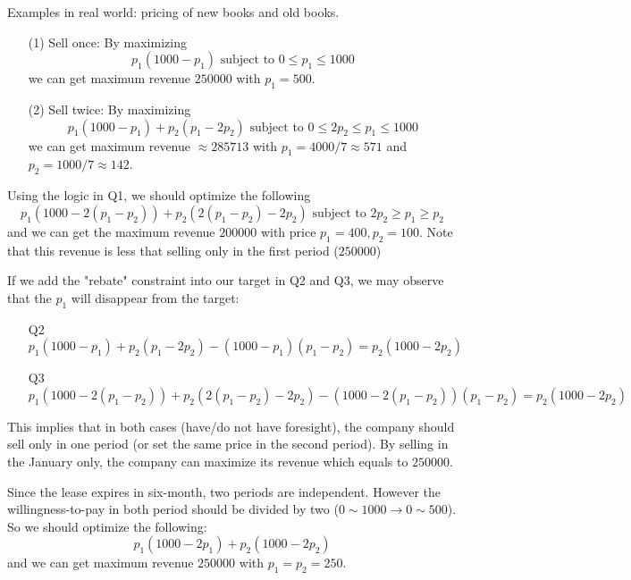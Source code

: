 \documentclass[a4paper]{article}
\begin{document}
    \begin{remarks}[Q1]
    Examples in real world: pricing of new books and old books.
    \end{remarks}
    \begin{answer}[Q2]
    \begin{itemize}
        \item[(1)] Sell once:
        By maximizing
        \[
            p_1(1000-p_1) \text{ subject to } 0 \le p_1 \le 1000
        \]
        we can get maximum revenue $250000$ with $p_1=500$.
        \item[(2)] Sell twice:
        By maximizing
        \[
            p_1(1000-p_1) + p_2(p_1-2p_2) \text{ subject to } 0 \le 2p_2\le p_1\le 1000
        \]
        we can get maximum revenue $\approx 285713$ with $p_1=4000/7\approx571$ and $p_2=1000/7\approx 142$.
    \end{itemize}
    \end{answer}
    \begin{answer}[Q3]
        Using the logic in Q1, we should optimize the following
        \[
            p_1(1000-2(p_1-p_2))+p_2(2(p_1-p_2)-2p_2) \text{ subject to } 2p_2 \ge p_1 \ge p_2
        \]
        and we can get the maximum revenue $200000$  with price $p_1=400,p_2=100$. Note that this revenue is less that selling only in the first period ($250000$)
    \end{answer}
    \begin{answer}[Q4]
    If we add the "rebate" constraint into our target in Q2 and Q3, we may observe that the $p_1$ will disappear from the target:
    \begin{itemize}
        \item[Q2]
        \[
            p_1(1000-p_1)+p_2(p_1-2p_2)-(1000-p_1)(p_1-p_2) = p_2(1000-2p_2)
        \]
        \item[Q3]
        \[
            p_1(1000-2(p_1-p_2))+p_2(2(p_1-p_2)-2p_2)-(1000-2(p_1-p_2))(p_1-p_2) = p_2(1000-2p_2)
        \]
    \end{itemize}
    This implies that in both cases (have/do not have foresight), the company should sell only in one period (or set the same price in the second period). By selling in the January only, the company can maximize its revenue which equals to $250000$. 
    \end{answer}
    \begin{answer}[Q5]
    Since the lease expires in six-month, two periods are independent. However the willingness-to-pay in both period should be divided by two ($0\sim 1000 \rightarrow 0\sim 500$). So we should optimize the following:
    \[
        p_1(1000-2p_1)+p_2(1000-2p_2)
    \]
    and we can get maximum revenue $250000$ with $p_1=p_2=250$.
    \end{answer}
    
\end{document}
